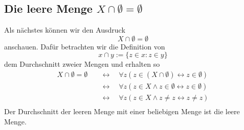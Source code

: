 \documentclass[11pt, a4paper]{article}
\begin{document}
\subsection{Die leere Menge $X\cap\emptyset = \emptyset$}
Als nächstes können wir den Ausdruck
\[
X\cap\emptyset = \emptyset
\]
anschauen. Dafür betrachten wir die Definition von
\[
    x\cap y := \{z\in x: z\in y\}
\]
dem Durchschnitt zweier Mengen und erhalten so
\begin{equation}
\begin{split}
X\cap\emptyset = \emptyset
& \quad\leftrightarrow\quad \forall z(z\in (X\cap\emptyset) \leftrightarrow
z\in\emptyset) \\
& \quad\leftrightarrow\quad\forall z(z\in X \land z\in\emptyset
\leftrightarrow z\in\emptyset) \\
& \quad\leftrightarrow\quad\forall z(z\in X \land z\neq z \leftrightarrow z
\neq z) \\
\end{split}
\end{equation}
Der Durchschnitt der leeren Menge mit einer beliebigen Menge ist die leere
Menge.
\newpage


\end{document}
